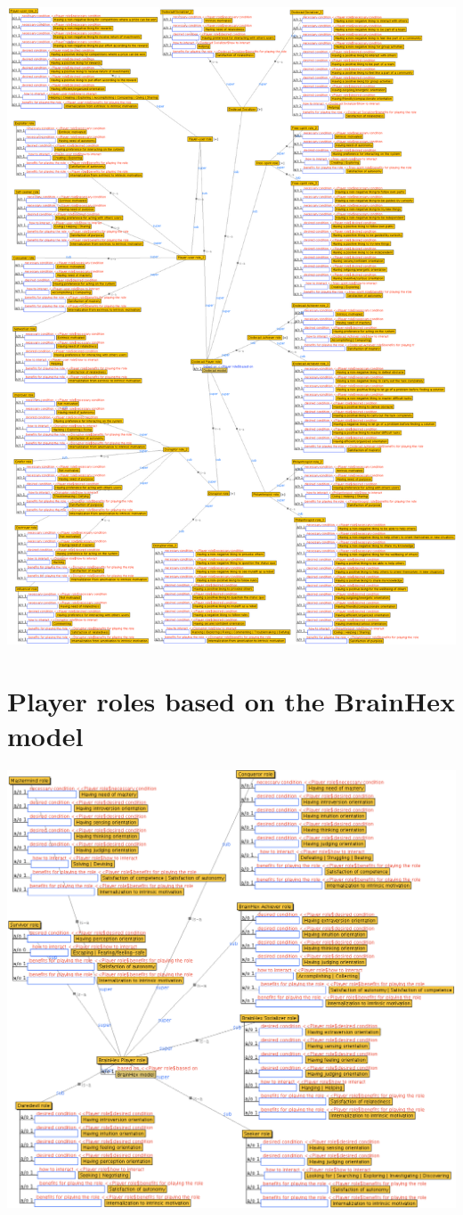 \includegraphics[width=1\textwidth]{images/appendix/player-roles-based-dodecad.png}

\section{Player roles based on the BrainHex model}
\label{sec:player-roles-based-brainhex}

\includegraphics[width=1\textwidth]{images/appendix/player-roles-based-brainhex.png}

